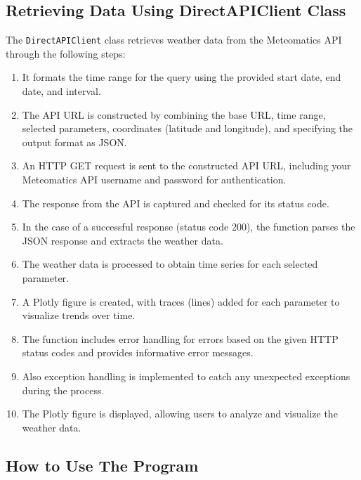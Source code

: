 	\subsection*{Retrieving Data Using DirectAPIClient Class}
	The \texttt{DirectAPIClient} class retrieves weather data from the Meteomatics API through the following steps:
	
	\begin{enumerate}
	\item It formats the time range for the query using the provided start date, end date, and interval.
	\item The API URL is constructed by combining the base URL, time range, selected parameters, coordinates (latitude and longitude), and specifying the output format as JSON.
	\item An HTTP GET request is sent to the constructed API URL, including your Meteomatics API username and password for authentication.
	\item The response from the API is captured and checked for its status code.
	\item In the case of a successful response (status code 200), the function parses the JSON response and extracts the weather data.
	\item The weather data is processed to obtain time series for each selected parameter.
	\item A Plotly figure is created, with traces (lines) added for each parameter to visualize trends over time.
	\item The function includes error handling for errors based on the given HTTP status codes and provides informative error messages.
	\item Also exception handling is implemented to catch any unexpected exceptions during the process.
	\item The Plotly figure is displayed, allowing users to analyze and visualize the weather data.
	\end{enumerate}
	
	\subsection*{How to Use The Program}
	


